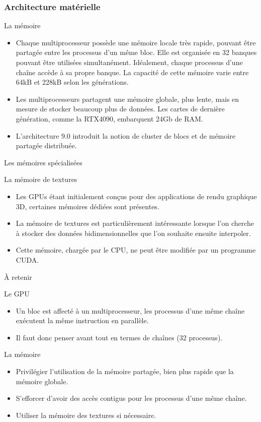 \begin{frame}
    \frametitle{Architecture matérielle}
\begin{block}{La mémoire}
   \begin{itemize}
    \item<+-> Chaque multiprocesseur possède une mémoire locale très rapide, pouvant être partagée entre les processus
    d'un même bloc. Elle est organisée en 32 banques pouvant être utilisées simultanément. Idéalement, 
    chaque processus d'une chaîne accède à sa propre banque. La capacité de cette mémoire varie entre 64kB et 228kB 
    selon les générations.
    \item<+-> Les multiprocesseurs partagent une mémoire globale, plus lente, mais en mesure de stocker beaucoup plus 
    de données. Les cartes de dernière génération, comme la RTX4090, embarquent 24Gb de RAM.
    \item<+-> L'architecture 9.0 introduit la notion de cluster de blocs et de mémoire partagée distribuée.
   \end{itemize} 
\end{block}
\end{frame}
\begin{frame}{Les mémoires spécialisées}
\begin{block}{La mémoire de textures}
   \begin{itemize}
    \item<+-> Les GPUs étant initialement conçus pour des applications de rendu graphique 3D, certaines mémoires
    dédiées sont présentes. 
    \item<+-> La mémoire de textures est particulièrement intéressante lorsque l'on cherche à stocker des données
    bidimensionnelles que l'on souhaite ensuite interpoler.
    \item<+-> Cette mémoire, chargée par le CPU, ne peut être modifiée par un programme CUDA.
   \end{itemize} 
\end{block}
\end{frame}
\begin{frame}{\`A retenir}
\begin{block}{Le GPU}
   \begin{itemize}
    \item<+-> Un bloc est affecté à un multiprocesseur, les processus d'une même chaîne exécutent la même instruction
    en parallèle.
    \item<+-> Il faut donc penser avant tout en termes de chaînes (32 processus).
   \end{itemize} 
\end{block}
\begin{block}{La mémoire}
  \begin{itemize}
   \item<+-> Privilégier l'utilisation de la mémoire partagée, bien plus rapide que la mémoire globale.
   \item<+-> S'efforcer d'avoir des accès contigus pour les processus d'une même chaîne.
   \item<+-> Utiliser la mémoire des textures si nécessaire.
  \end{itemize} 
\end{block}
\end{frame}
